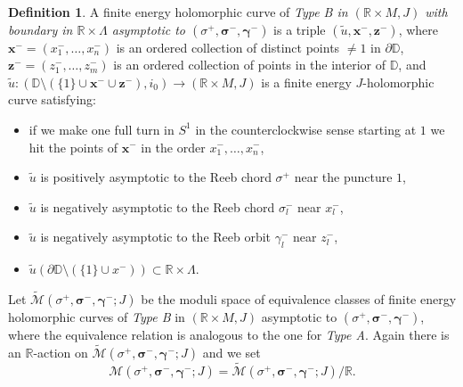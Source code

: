 \documentclass[10pt]{amsart}
\let\mathcal\mathscr
\newcommand{\bmx}{\boldsymbol{x}}
\newcommand{\bmz}{\boldsymbol{z}}
\theoremstyle{plain}
\theoremstyle{definition}
\newtheorem{defn}[thm]{Definition}
\numberwithin{equation}{subsection}
\newcommand{\RR}{\mathbb{R}}
\let\bs\boldsymbol
\begin{document}
\begin{defn}
A finite energy holomorphic curve of {\em \emph{Type B} in $(\mathbb{R}\times M,J)$ with boundary in $\mathbb{R}\times \Lambda$ asymptotic to $(\sigma^+,\bs\sigma^-,\bs\gamma^-)$} is a triple $(\widetilde{u},\bmx^-,\bmz^-)$, where $\bmx^- = (x^-_1,\dots,x^-_n)$ is an ordered collection of distinct points $\not=1$ in $\partial \mathbb{D}$, $\bmz^-=(z^-_1,\dots,z^-_m)$ is an ordered collection of points in the interior of $\mathbb{D}$, and $\widetilde{u}: (\mathbb{D} \setminus (\{1\}\cup \bmx^- \cup \bmz^-), i_0) \to (\mathbb{R}\times M,J)$ is a finite energy $J$-holomorphic curve satisfying:
\begin{itemize}
\item if we make one full turn in $S^1$ in the counterclockwise sense starting at $1$ we hit the points of $\bmx^-$ in the order $x^-_1,\dots,x^-_n$,
\item $\widetilde{u}$ is positively asymptotic to the Reeb chord $\sigma^+$ near the puncture $1$,
\item $\widetilde{u}$ is negatively asymptotic to the Reeb chord $\sigma^-_l$ near $x^-_l$,
\item $\widetilde{u}$ is negatively asymptotic to the Reeb orbit $\gamma^-_l$ near $z^-_l$,
\item $\widetilde{u}(\partial \mathbb{D} \setminus (\{1\}\cup x^-)) \subset \mathbb{R}\times \Lambda$.
\end{itemize}
\end{defn}

Let $\widetilde{\mathcal{M}}(\sigma^+,\bs\sigma^-,\bs\gamma^-;J)$ be the moduli space of equivalence classes of finite energy holomorphic curves of \emph{Type B} in $(\mathbb{R}\times M,J)$ asymptotic to $(\sigma^+,\bs\sigma^-,\bs\gamma^-)$, where the equivalence relation is analogous to the one for \emph{Type A}. Again there is an $\mathbb{R}$-action on $\widetilde{\mathcal{M}}(\sigma^+,\bs\sigma^-,\bs\gamma^-;J)$ and we set
$${\mathcal{M}}(\sigma^+,\bs\sigma^-,\bs\gamma^-;J)=\widetilde{\mathcal{M}}(\sigma^+,\bs\sigma^-,\bs\gamma^-;J)/\RR.$$
\end{document}
